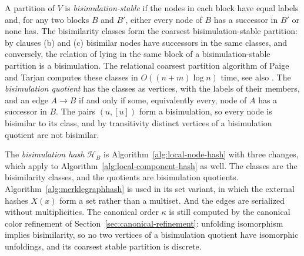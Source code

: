 \documentclass[twoside,leqno]{article}
\newcommand{\HB}{\mathcal{H}_{B}}
\begin{document}
A partition of $V$ is \emph{bisimulation-stable} if the nodes in each block have equal labels and, for any two blocks $B$ and $B'$, either every node of $B$ has a successor in $B'$ or none has. The bisimilarity classes form the coarsest bisimulation-stable partition: by clauses (b) and (c) bisimilar nodes have successors in the same classes, and conversely, the relation of lying in the same block of a bisimulation-stable partition is a bisimulation. The relational coarsest partition algorithm of Paige and Tarjan \cite{paige1987three} computes these classes in $O((n+m)\log n)$ time, see also \cite{kanellakis1990ccs}. The \emph{bisimulation quotient} has the classes as vertices, with the labels of their members, and an edge $A\to B$ if and only if some, equivalently every, node of $A$ has a successor in $B$. The pairs $(u,[u])$ form a bisimulation, so every node is bisimilar to its class, and by transitivity distinct vertices of a bisimulation quotient are not bisimilar.

The \emph{bisimulation hash} $\HB$ is Algorithm~\ref{alg:local-node-hash} with three changes, which apply to Algorithm~\ref{alg:local-component-hash} as well. The classes are the bisimilarity classes, and the quotients are bisimulation quotients. Algorithm~\ref{alg:merklegraphhash} is used in its set variant, in which the external hashes $X(x)$ form a set rather than a multiset. And the edges are serialized without multiplicities. The canonical order $\kappa$ is still computed by the canonical color refinement of Section~\ref{sec:canonical-refinement}: unfolding isomorphism implies bisimilarity, so no two vertices of a bisimulation quotient have isomorphic unfoldings, and its coarsest stable partition is discrete.
\end{document}
